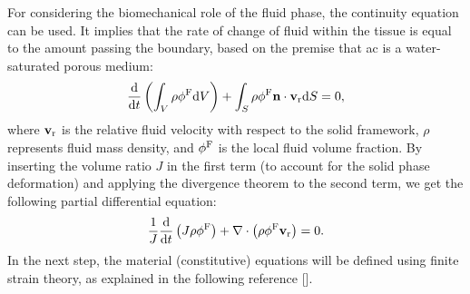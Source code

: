 \documentclass[12pt,a4paper]{report}
\begin{document}
For considering the biomechanical role of the fluid phase, the continuity equation can be used. It implies that the rate of change of fluid within the tissue is equal to the amount passing the boundary, based on the premise that \ac{ac} is a water-saturated porous medium:
%
\begin{equation}
    \frac{{\rm d}}{{\rm d}t}\left ( \int_V \rho \phi^{\rm F} {\rm d}V \right ) + \int_S \rho \phi^{\rm F} \textbf{n} \cdot \textbf{v}_{\rm r} {\rm d}S = 0,
\end{equation}
%
where $\textbf{v}_{\rm r}$ is the relative fluid velocity with respect to the solid framework, $\rho$ represents fluid mass density, and $\phi^{\rm F}$ is the local fluid volume fraction. By inserting the volume ratio $J$ in the first term (to account for the solid phase deformation) and applying the divergence theorem to the second term, we get the following partial differential equation:
%
\begin{equation}\label{eq-pde}
    \frac{1}{J}\frac{{\rm d}}{{\rm d}t}\left (J\rho \phi^{\rm F} \right ) + \nabla \cdot \left ( \rho \phi^{\rm F} \textbf{v}_{\rm r} \right ) = 0.
\end{equation}
%
In the next step, the material (constitutive) equations will be defined using finite strain theory, as explained in the following reference [\cite{gerhard-book}].
\end{document}
